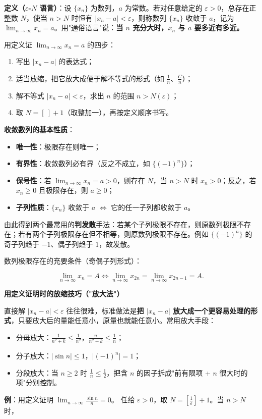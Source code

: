 \documentclass[11pt,openany,UTF8]{ctexbook}
\begin{document}
\textbf{定义（$\varepsilon$-$N$ 语言）}：设 $\{x_n\}$ 为数列，$a$ 为常数。若对任意给定的 $\varepsilon>0$，总存在正整数 $N$，使当 $n>N$ 时恒有 $\vert x_n-a\vert<\varepsilon$，则称数列 $\{x_n\}$ 收敛于 $a$，记为 $\lim_{n\to\infty}x_n=a$。用"通俗语言"说：\textbf{当 $n$ 充分大时，$x_n$ 与 $a$ 要多近有多近。}

用定义证 $\lim_{n\to\infty}x_n=a$ 的四步：

\begin{enumerate}
\item 写出 $\vert x_n-a\vert$ 的表达式；
\item 适当放缩，把它放大成便于解不等式的形式（如 $\frac{1}{n}$、$\frac{C}{n}$）；
\item 解不等式 $\vert x_n-a\vert<\varepsilon$，求出 $n$ 的范围 $n>N(\varepsilon)$；
\item 取 $N=\left[\ \right]+1$（取整加一），再按定义顺序书写。
\end{enumerate}
\textbf{收敛数列的基本性质}：

\begin{itemize}
\item \textbf{唯一性}：极限存在则唯一；
\item \textbf{有界性}：收敛数列必有界（反之不成立，如 $\{(-1)^n\}$）；
\item \textbf{保号性}：若 $\lim_{n\to\infty}x_n=a>0$，则存在 $N$，当 $n>N$ 时 $x_n>0$；反之，若 $x_n\ge 0$ 且极限存在，则 $a\ge 0$；
\item \textbf{子列性质}：$\{x_n\}$ 收敛于 $a$ $\iff$ 它的任一子列都收敛于 $a$。
\end{itemize}
由此得到两个最常用的\textbf{判发散}手法：若某个子列极限不存在，则原数列极限不存在；若有两个子列极限存在但不相等，则原数列极限不存在。例如 $\{(-1)^n\}$ 的奇子列趋于 $-1$、偶子列趋于 $1$，故发散。

数列极限存在的充要条件（奇偶子列形式）：

\[\lim_{n\to\infty}x_n=A \iff \lim_{n\to\infty}x_{2n}=\lim_{n\to\infty}x_{2n-1}=A .\]

\textbf{用定义证明时的放缩技巧（"放大法"）}

直接解 $\vert x_n-a\vert<\varepsilon$ 往往很难，标准做法是\textbf{把 $\vert x_n-a\vert$ 放大成一个更容易处理的形式}，只要放大后的量能任意小，原量也就能任意小。常用放大手段：

\begin{itemize}
\item 分母放大：$\frac{1}{n^{2}+k}\le\frac1{n^{2}}$，$\frac{n}{n^{2}+k}\le\frac{1}{n}$；
\item 分子放大：$\vert\sin n\vert\le 1$，$\vert(-1)^{n}\vert=1$；
\item 分段放大：当 $n\ge 2$ 时 $\frac{1}{n}\le\frac{1}{2}$，把含 $n$ 的因子拆成"前有限项 + $n$ 很大时的项"分别控制。
\end{itemize}
\textbf{例}：用定义证明 $\lim_{n\to\infty}\frac{\sin n}{n}=0$。 任给 $\varepsilon>0$，取 $N=\left[\frac1\varepsilon\right]+1$。当 $n>N$ 时，
\end{document}
